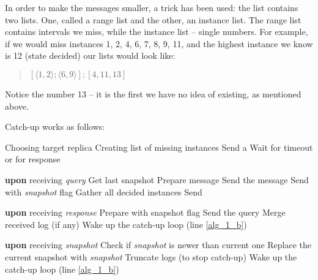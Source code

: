 In order to make the messages smaller, a trick has been used: the list contains two lists. One, called a range list and the other, an instance list.
The range list contains intervals we miss, while the instance list -- single numbers. For example, if we would miss instances 1, 2, 4, 6, 7, 8, 9, 11, and the highest instance we know is 12 (state decided) our lists would look like:
\begin{quote}
$[\langle1,2\rangle; \langle6,9\rangle]; [4,11,13]$
\end{quote} 
Notice the number 13 -- it is the first we have no idea of existing, as mentioned above.

Catch-up works as follows:

\begin{algorithmic}[1]
  \REPEAT
    \STATE \label{alg_1_a} Choosing target replica
    \STATE Creating list of missing instances
    \STATE Send a \catchUpQuery
    \STATE \label{alg_1_b} Wait for timeout or for response
  
  \vspace{0.5em}
  
  \STATE \textbf{upon} receiving \catchUpQuery \textit{query}
      \STATE Get last snapshot
      \STATE Prepare \catchUpSnapshot message
      \STATE Send the message
      \STATE Send \catchUpResponse with \textit{snapshot} flag
    \ELSE
      \STATE Gather all decided instances
      \STATE Send \catchUpResponse
    \ENDIF

  \vspace{0.5em}
  \STATE \textbf{upon} receiving \catchUpResponse \textit{response}
      \STATE Prepare \catchUpQuery with snapshot flag
      \STATE Send the query
    \ELSE
      \STATE Merge received log (if any)
      \STATE Wake up the catch-up loop (line \ref{alg_1_b})
    \ENDIF
  
  \vspace{0.5em}
  \STATE \textbf{upon} receiving \catchUpSnapshot \textit{snapshot}
  \STATE Check if \textit{snapshot} is newer than current one
  \STATE Replace the current snapshot with \textit{snapshot}
  \STATE Truncate logs (to stop catch-up)
  \STATE Wake up the catch-up loop (line \ref{alg_1_b})

\end{algorithmic}

\vspace{1em}


